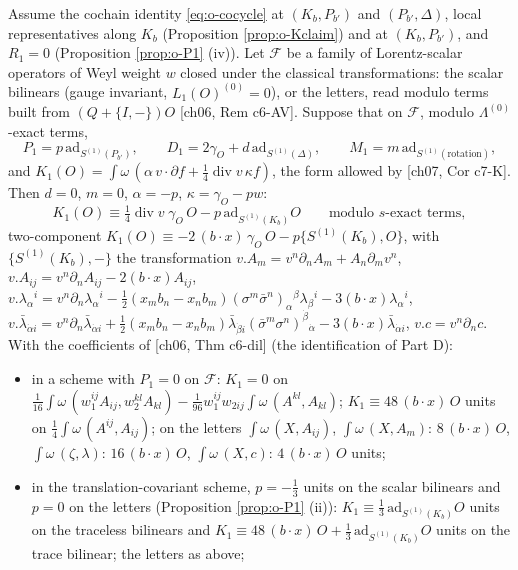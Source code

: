\begin{theorem}
\label{thm:o-KD}
Assume the cochain identity \eqref{eq:o-cocycle} at $(K_b,P_{b'})$ and $(P_{b'},\Delta)$, local representatives along $K_b$ (Proposition \ref{prop:o-Kclaim}) and at $(K_b,P_{b'})$, and $R_1=0$ (Proposition \ref{prop:o-P1} (iv)). Let $\mathcal F$ be a family of Lorentz-scalar operators of Weyl weight $w$ closed under the classical transformations: the scalar bilinears (gauge invariant, $L_1(O)^{(0)}=0$), or the letters, read modulo terms built from $(Q+\{I,-\})O$ [ch06, Rem c6-AV]. Suppose that on $\mathcal F$, modulo $\Lambda^{(0)}$-exact terms,
\[
P_1=p\,\mathrm{ad}_{S^{(1)}(P_{b'})},\qquad D_1=2\gamma_O+d\,\mathrm{ad}_{S^{(1)}(\Delta)},\qquad M_1=m\,\mathrm{ad}_{S^{(1)}(\text{rotation})},
\]
and $K_1(O)=\int\omega\,(\alpha\,v\cdot\partial f+\tfrac14\operatorname{div}v\,\kappa f)$, the form allowed by [ch07, Cor c7-K]. Then $d=0$, $m=0$, $\alpha=-p$, $\kappa=\gamma_O-pw$:
\begin{equation}
K_1(O)\equiv\tfrac14\operatorname{div}v\;\gamma_O\,O-p\,\mathrm{ad}_{S^{(1)}(K_b)}O\qquad\text{modulo }s\text{-exact terms},
\label{eq:o-KD}
\end{equation}
two-component $K_1(O)\equiv-2\,(b\cdot x)\,\gamma_O\,O-p\{S^{(1)}(K_b),O\}$, with $\{S^{(1)}(K_b),-\}$ the transformation $v.A_m=v^n\partial_nA_m+A_n\partial_mv^n$, $v.A_{ij}=v^n\partial_nA_{ij}-2(b\cdot x)A_{ij}$, $v.\lambda_\alpha{}^i=v^n\partial_n\lambda_\alpha{}^i-\tfrac12(x_mb_n-x_nb_m)(\sigma^m\bar\sigma^n)_\alpha{}^\beta\lambda_\beta{}^i-3(b\cdot x)\lambda_\alpha{}^i$, $v.\bar\lambda_{\dot\alpha i}=v^n\partial_n\bar\lambda_{\dot\alpha i}+\tfrac12(x_mb_n-x_nb_m)\bar\lambda_{\dot\beta i}(\bar\sigma^m\sigma^n)^{\dot\beta}{}_{\dot\alpha}-3(b\cdot x)\bar\lambda_{\dot\alpha i}$, $v.c=v^n\partial_nc$. With the coefficients of [ch06, Thm c6-dil] (the identification of Part D):
\begin{itemize}
\item in a scheme with $P_1=0$ on $\mathcal F$: $K_1=0$ on $\tfrac1{16}\int\omega\,(w_1^{ij}A_{ij},w_2^{kl}A_{kl})-\tfrac1{96}w_1^{ij}w_{2ij}\int\omega\,(A^{kl},A_{kl})$; $K_1\equiv48\,(b\cdot x)\,O$ units on $\tfrac14\int\omega\,(A^{ij},A_{ij})$; on the letters $\int\omega\,(X,A_{ij})$, $\int\omega\,(X,A_m)$: $8\,(b\cdot x)\,O$, $\int\omega\,(\zeta,\lambda)$: $16\,(b\cdot x)\,O$, $\int\omega\,(X,c)$: $4\,(b\cdot x)\,O$ units;
\item in the translation-covariant scheme, $p=-\tfrac13$ units on the scalar bilinears and $p=0$ on the letters (Proposition \ref{prop:o-P1} (ii)): $K_1\equiv\tfrac13\,\mathrm{ad}_{S^{(1)}(K_b)}O$ units on the traceless bilinears and $K_1\equiv48\,(b\cdot x)\,O+\tfrac13\,\mathrm{ad}_{S^{(1)}(K_b)}O$ units on the trace bilinear; the letters as above;

\end{itemize}
\end{theorem}
